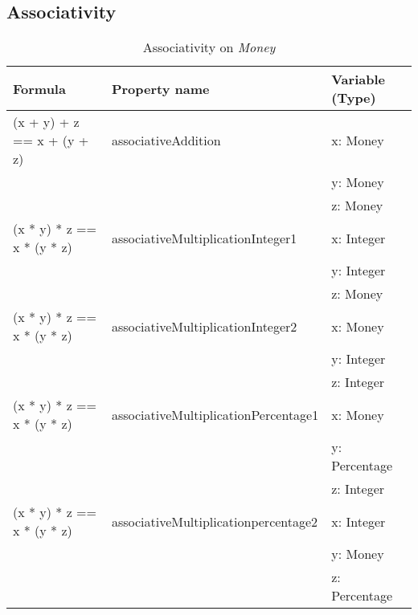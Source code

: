 \subsection*{Associativity}
\label{ssct:4_associativity}
\begin{table}[h!]
\centering
\begin{tabular}{|lll|}
\hline
                        \textbf{Formula}           & \textbf{Property name}               & \textbf{Variable (Type)} \\ \hline
\rowcolor[HTML]{EFEFEF} (x + y) + z == x + (y + z) & associativeAddition                  & x: Money                 \\
\rowcolor[HTML]{EFEFEF}                            &                                      & y: Money                 \\
\rowcolor[HTML]{EFEFEF}                            &                                      & z: Money                 \\
                        (x * y) * z == x * (y * z) & associativeMultiplicationInteger1    & x: Integer               \\
                                                   &                                      & y: Integer               \\
                                                   &                                      & z: Money                 \\
\rowcolor[HTML]{EFEFEF} (x * y) * z == x * (y * z) & associativeMultiplicationInteger2    & x: Money                 \\
\rowcolor[HTML]{EFEFEF}                            &                                      & y: Integer               \\
\rowcolor[HTML]{EFEFEF}                            &                                      & z: Integer               \\
                        (x * y) * z == x * (y * z) & associativeMultiplicationPercentage1 & x: Money                 \\
                                                   &                                      & y: Percentage            \\
                                                   &                                      & z: Integer               \\
\rowcolor[HTML]{EFEFEF} (x * y) * z == x * (y * z) & associativeMultiplicationpercentage2 & x: Integer               \\
\rowcolor[HTML]{EFEFEF}                            &                                      & y: Money                 \\
\rowcolor[HTML]{EFEFEF}                            &                                      & z: Percentage            \\ \hline
\end{tabular}
\caption{Associativity on \textit{Money}}
\label{tbl:ch4_money_associativity}
\end{table}

